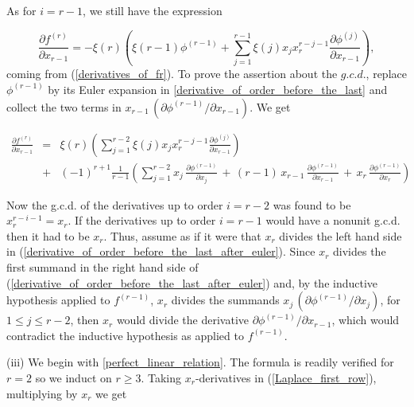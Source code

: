 \documentclass[11pt]{article}   %
\theoremstyle{definition}
\numberwithin{Theorem}{section} \numberwithin{equation}{section}
\begin{document}
{As for $i=r-1$, we still have the
expression

\begin{equation}\label{derivative_of_order_before_the_last}
\frac{\partial f^{(r)}}{\partial
x_{r-1}}=-\xi(r)\left(\xi(r-1)\phi^{(r-1)}+ \sum_{j=1}^{r-1}\xi(j) x_j
x_r^{r-j-1}\frac{\partial \phi^{(j)}}{\partial x_{r-1}}\right),
\end{equation}
coming from  (\ref{derivatives_of_fr}). To prove the assertion
about the $g.c.d.$, replace $\phi^{(r-1)}$ by its Euler expansion in
\eqref{derivative_of_order_before_the_last} and collect the two
terms in $x_{r-1}\,(\partial \phi^{(r-1)}/\partial x_{r-1})$. We get

\begin{eqnarray}\label{derivative_of_order_before_the_last_after_euler}
\frac{\partial f^{(r)}}{\partial
x_{r-1}}&=&\xi(r)\left(\sum_{j=1}^{r-2}\xi(j) x_j
x_r^{r-j-1}\frac{\partial \phi^{(j)}}{\partial x_{r-1}}\right)\\
\nonumber
 &+&(-1)^{r+1}\frac{1}{r-1}\left(\sum_{j=1}^{r-2} x_j\,\frac{\partial
\phi^{(r-1)}}{\partial x_j}\, + \, (r-1)\,x_{r-1}\,\frac{\partial
\phi^{(r-1)}}{\partial x_{r-1}}\, +\, x_r\,\frac{\partial
\phi^{(r-1)}}{\partial x_r}\right)
\end{eqnarray}

 Now the g.c.d. of the derivatives up
to order $i=r-2$ was found to be $x_r^{r-i-1}=x_r$. If the
derivatives up to order $i=r-1$ would have a nonunit g.c.d. then it had
to be $x_r$. Thus, assume as if it were that $x_r$ divides the left
hand side in
(\ref{derivative_of_order_before_the_last_after_euler}). Since $x_r$
divides the first summand in the right hand side of
(\ref{derivative_of_order_before_the_last_after_euler}) and, by the
inductive hypothesis applied to $f^ {(r-1)}$, $x_r$ divides the summands $x_j\,(\partial
\phi^{(r-1)}/\partial x_j)$, for $1\leq j\leq r-2$, then $x_r$ would
divide the derivative $\partial \phi^{(r-1)}/\partial x_{r-1}$, which
would contradict the inductive hypothesis as applied to $f^{(r-1)}$.


(iii) We begin with  \eqref{perfect_linear_relation}.
 The formula is readily verified for $r=2$ so we induct on $r\geq 3$.
Taking $x_r$-derivatives in (\ref{Laplace_first_row}),
multiplying by $x_r$ we get

}
\end{document}
